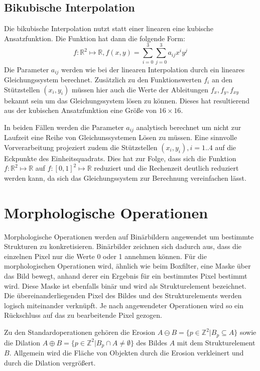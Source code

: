 \subsection*{Bikubische Interpolation}
Die bikubische Interpolation nutzt statt einer linearen eine kubische Ansatzfunktion. Die Funktion hat dann die folgende Form:
\begin{equation*}
 f: \mathbb{R}^2\mapsto\mathbb{R}, f(x, y)=\sum_{i=0}^3 \sum_{j=0}^3 a_{ij}x^iy^j
\end{equation*}
Die Parameter \(a_{ij} \) werden wie bei der linearen Interpolation durch ein lineares Gleichungssystem berechnet. Zus\"atzlich zu den Funktionswerten \(f_i\) an den St\"utzstellen \( (x_i, y_i) \) m\"ussen hier auch die Werte der Ableitungen \( f_x, f_y, f_{xy} \) bekannt sein um das Gleichungssystem l\"osen zu k\"onnen. Dieses hat resultierend aus der kubischen Ansatzfunktion eine Gr\"o\ss{}e von \( 16\times 16 \). 

In beiden F\"allen werden die Parameter \(a_{ij} \) analytisch berechnet um nicht zur Laufzeit eine Reihe von Gleichunssystemen L\"osen zu m\"ussen. Eine sinnvolle Vorverarbeitung projeziert zudem die St\"utzstellen \( (x_i, y_i), i=1..4 \) auf die Eckpunkte des Einheitsquadrats. Dies hat zur Folge, dass sich die Funktion \( f: \mathbb{R}^2\mapsto\mathbb{R} \) auf \( f: [0, 1]^2\mapsto\mathbb{R} \) reduziert und die Rechenzeit deutlich reduziert werden kann, da sich das Gleichungssystem zur Berechnung vereinfachen l\"asst.

\section{Morphologische Operationen}
Morphologische Operationen werden auf Bin\"arbildern angewendet um bestimmte Strukturen zu konkretisieren. Bin\"arbilder zeichnen sich dadurch aus, dass die einzelnen Pixel nur die Werte 0 oder 1 annehmen k\"onnen. F\"ur die morphologischen Operationen wird, \"ahnlich wie beim Boxfilter, eine Maske \"uber das Bild bewegt, anhand derer ein Ergebnis f\"ur ein bestimmtes Pixel bestimmt wird. Diese Maske ist ebenfalls bin\"ar und wird als Strukturelement bezeichnet. Die \"ubereinanderliegenden Pixel des Bildes und des Strukturelements werden logisch miteinander verkn\"upft. Je nach angewendeter Operationen wird so ein R\"uckschluss auf das zu bearbeitende Pixel gezogen.

Zu den Standardoperationen geh\"oren die Erosion \( A \ominus B = \{ p \in  \mathbb{Z}^2 | B_p \subseteq A  \} \)  sowie die Dilation \( A \oplus B = \{ p \in \mathbb{Z}^2 | B_p \cap A \neq \emptyset \} \) des Bildes \(A\) mit dem Strukturelement \(B \). Allgemein wird die Fl\"ache von Objekten durch die Erosion verkleinert und durch die Dilation vergr\"o\ss{}ert. 

